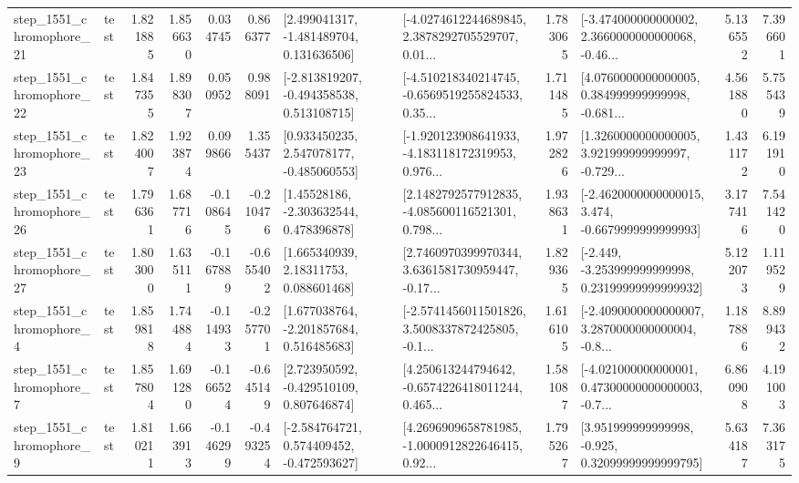 \begin{tabular}{llrrrrllrlrr}
 step\_1551\_chromophore\_21 &      test &      1.821885 &    1.856630 &      0.034745 &  0.866377 &    [2.499041317, -1.481489704, 0.131636506] &  [-4.0274612244689845, 2.3878292705529707, 0.01... &       1.783065 &  [-3.474000000000002, 2.3660000000000068, -0.46... &            5.136552 &          7.396601 \\
 step\_1551\_chromophore\_22 &      test &      1.847355 &    1.898307 &      0.050952 &  0.988091 &   [-2.813819207, -0.494358538, 0.513108715] &  [-4.510218340214745, -0.6569519255824533, 0.35... &       1.711485 &  [4.0760000000000005, 0.384999999999998, -0.681... &            4.561880 &          5.755439 \\
 step\_1551\_chromophore\_23 &      test &      1.824007 &    1.923874 &      0.099866 &  1.355437 &    [0.933450235, 2.547078177, -0.485060553] &  [-1.920123908641933, -4.183118172319953, 0.976... &       1.972826 &  [1.3260000000000005, 3.921999999999997, -0.729... &            1.431172 &          6.191910 \\
 step\_1551\_chromophore\_26 &      test &      1.796361 &    1.687716 &     -0.108645 & -0.210476 &     [1.45528186, -2.303632544, 0.478396878] &  [2.1482792577912835, -4.085600116521301, 0.798... &       1.938631 &  [-2.4620000000000015, 3.474, -0.6679999999999993] &            3.177416 &          7.541420 \\
 step\_1551\_chromophore\_27 &      test &      1.803000 &    1.635111 &     -0.167889 & -0.655402 &      [1.665340939, 2.18311753, 0.088601468] &  [2.7460970399970344, 3.6361581730959447, -0.17... &       1.829365 &  [-2.449, -3.253999999999998, 0.23199999999999932] &            5.122073 &          1.119529 \\
  step\_1551\_chromophore\_4 &      test &      1.859818 &    1.744884 &     -0.114933 & -0.257701 &    [1.677038764, -2.201857684, 0.516485683] &  [-2.5741456011501826, 3.5008337872425805, -0.1... &       1.616105 &  [-2.4090000000000007, 3.2870000000000004, -0.8... &            1.187886 &          8.899432 \\
  step\_1551\_chromophore\_7 &      test &      1.857804 &    1.691280 &     -0.166524 & -0.645149 &    [2.723950592, -0.429510109, 0.807646874] &  [4.250613244794642, -0.6574226418011244, 0.465... &       1.581087 &  [-4.021000000000001, 0.47300000000000003, -0.7... &            6.860908 &          4.191003 \\
  step\_1551\_chromophore\_9 &      test &      1.810211 &    1.663913 &     -0.146299 & -0.493254 &   [-2.584764721, 0.574409452, -0.472593627] &  [4.2696909658781985, -1.0000912822646415, 0.92... &       1.795267 &   [3.951999999999998, -0.925, 0.32099999999999795] &            5.634187 &          7.363175 \\

\end{tabular}

